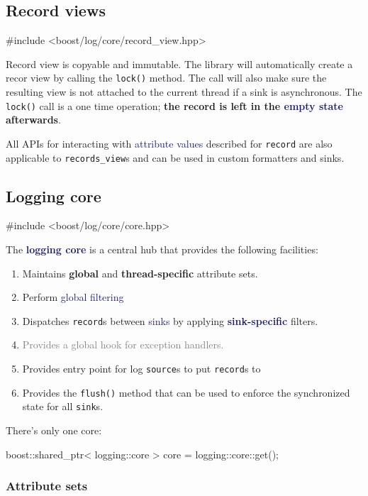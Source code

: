\documentclass[dvipsnames]{article}
\newcommand{\mycola}{MidnightBlue}
\newcommand{\cola}[1]{\textcolor{\mycola}{#1}}
\newcommand{\colz}[1]{\textcolor{gray}{#1}}
\newcommand{\Cola}[1]{\textcolor{\mycola}{\textbf{#1}}}
\begin{document}
\subsection{Record views}
\begin{simplec}
  #include <boost/log/core/record_view.hpp>
\end{simplec}
Record view is copyable and immutable. The library will automatically create a
recor view by calling the \texttt{lock()} method. The call will also make sure
the resulting view is not attached to the current thread if a sink is
asynchronous. The \texttt{lock()} call is a one time operation; \textbf{the
  record is left in the \cola{empty state} afterwards}.

All APIs for interacting with \cola{attribute values} described for
\texttt{record} are also applicable to \texttt{records\_view}s and can be used
in custom formatters and sinks.

\subsection{Logging core}
\begin{simplec}
  #include <boost/log/core/core.hpp>
\end{simplec}
The \Cola{logging core} is a central hub that provides the following facilities:
\begin{enumerate}
\item Maintains \textbf{global} and \textbf{thread-specific} attribute sets.
\item Perform \cola{global filtering}
\item Dispatches \texttt{record}s between \cola{sinks} by applying
  \Cola{sink-specific} filters.
\item \colz{Provides a global hook for exception handlers.}
\item Provides entry point for log \texttt{source}s to put \texttt{record}s to
\item Provides the \texttt{flush()} method that can be used to enforce the
  synchronized state for all \texttt{sink}s.
\end{enumerate}

There's only one core:
\begin{simplec}
  boost::shared_ptr< logging::core > core = logging::core::get();
\end{simplec}

\subsubsection{Attribute sets}
\end{document}
